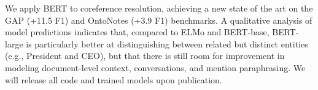 We apply BERT to coreference resolution, achieving a new state of the art on the GAP (+11.5 F1) and OntoNotes (+3.9 F1) benchmarks. A qualitative analysis of model predictions indicates that, compared to ELMo and BERT-base, BERT-large is particularly better at distinguishing between related but distinct entities (e.g., President and CEO),
but that there is still room for improvement in modeling document-level context, conversations, and mention paraphrasing. We will release all code and trained models upon publication.